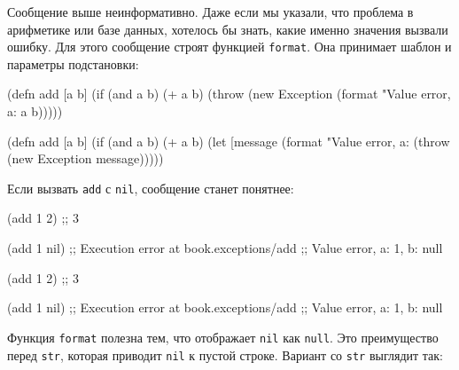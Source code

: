 \fi

Сообщение выше неинформативно. Даже если мы указали, что проблема в арифметике
или базе данных, хотелось бы знать, какие именно значения вызвали ошибку. Для
этого сообщение строят функцией \verb|format|. Она принимает шаблон и
параметры подстановки:


\ifnarrow

\begin{english}
  \begin{clojure}
(defn add [a b]
  (if (and a b)
    (+ a b)
    (throw
      (new Exception
        (format
          "Value error, a: %
          a b)))))
  \end{clojure}
\end{english}

\else

\begin{english}
  \begin{clojure}
(defn add [a b]
  (if (and a b)
    (+ a b)
    (let [message
          (format "Value error, a: %
      (throw (new Exception message)))))
  \end{clojure}
\end{english}

\fi

\noindent
Если вызвать \verb|add| с \verb|nil|, сообщение станет понятнее:

\ifnarrow

\begin{english}
  \begin{clojure}
(add 1 2) ;; 3

(add 1 nil)
;; Execution error at book.exceptions/add
;; Value error, a: 1, b: null
  \end{clojure}
\end{english}

\else

\begin{english}
  \begin{clojure}
(add 1 2) ;; 3

(add 1 nil)
;; Execution error at book.exceptions/add
;; Value error, a: 1, b: null
  \end{clojure}
\end{english}

\fi

Функция \verb|format| полезна тем, что отображает \verb|nil| как
\verb|null|. Это преимущество перед \verb|str|, которая приводит
\verb|nil| к пустой строке. Вариант со \verb|str| выглядит так:

